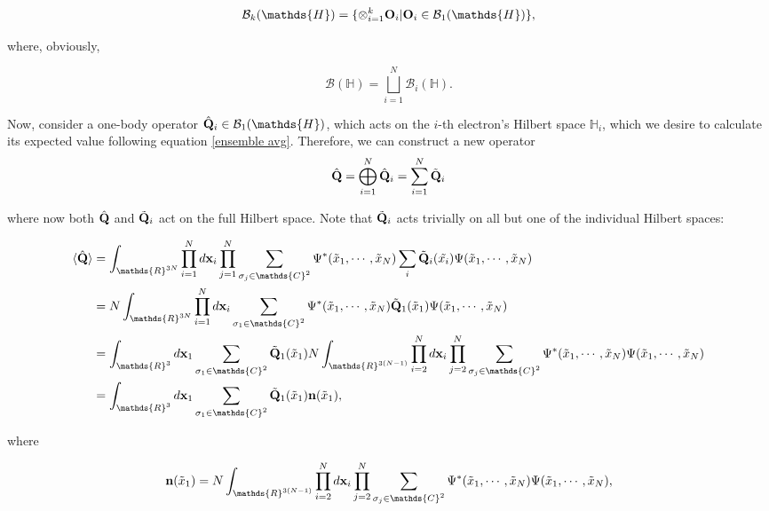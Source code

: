 \documentclass{homework}
\begin{document}
$$
\mathcal{B}_k(\mathds{H}) = \{\otimes_{i=1}^{k} {\bf O}_i | {\bf O}_i \in \mathcal{B}_1(\mathds{H}) \},
$$

where, obviously,

$$
\mathcal{B}(\mathds{H}) = \bigsqcup_{i=1}^{N} \mathcal{B}_i(\mathds{H}).
$$

Now, consider a one-body operator $\hat{\bf Q}_i \in \mathcal{B}_{1}(\mathds{H})$, which acts on the $i$-th electron's Hilbert space $\mathds{H}_i$, which we desire to calculate its expected value following equation \eqref{ensemble avg}. Therefore, we can construct a new operator 
$$
\hat{\bf Q} = \bigoplus_{i=1}^{N} \hat{\bf Q}_i = \sum_{i=1}^{N} \tilde{\bf Q}_i
$$

where now both $\hat{\bf Q}$ and $\tilde{\bf Q}_i$ act on the full Hilbert space. Note that $\tilde{\bf Q}_i$ acts trivially on all but one of the individual Hilbert spaces:

\begin{align}
     \langle \hat{\bf Q} \rangle &= \int_{\mathds{R}^{3N}} \prod_{i=1}^N d{\bf x}_i \prod_{j=1}^{N} \sum_{\sigma_j \in \mathds{C}^2} \Psi^{*}(\tilde{x}_1, \cdots, \tilde{x}_N)
     \sum_{i}
     \tilde{\bf Q}_i(\tilde{x_i})
     \Psi(\tilde{x}_1, \cdots, \tilde{x}_N) \\
     &= N \int_{\mathds{R}^{3N}} \prod_{i=1}^N d{\bf x}_i \sum_{\sigma_1 \in \mathds{C}^2} \Psi^{*}(\tilde{x}_1, \cdots, \tilde{x}_N)
     \tilde{\bf Q}_1(\tilde{x}_1)
     \Psi(\tilde{x}_1, \cdots, \tilde{x}_N) \\
     &= \int_{\mathds{R}^{3}} d{\bf x}_1 \sum_{\sigma_1 \in \mathds{C}^2} \tilde{\bf Q}_1(\tilde{x}_1) N \int_{\mathds{R}^{3(N-1)}} \prod_{i=2}^N d{\bf x}_i \prod_{j=2}^{N} \sum_{\sigma_j \in \mathds{C}^2} \Psi^{*}(\tilde{x}_1, \cdots, \tilde{x}_N)
     \Psi(\tilde{x}_1, \cdots, \tilde{x}_N) \\
     &= \int_{\mathds{R}^{3}} d{\bf x}_1 \sum_{\sigma_1 \in \mathds{C}^2} \tilde{\bf Q}_1(\tilde{x}_1) {\bf n}(\tilde{x}_1),
\label{one-body ensemble avg}
\end{align}

where 
 
\begin{equation}
{\bf n}(\tilde{x}_1) = N \int_{\mathds{R}^{3(N-1)}} \prod_{i=2}^N d{\bf x}_i \prod_{j=2}^{N} \sum_{\sigma_j \in \mathds{C}^2} \Psi^{*}(\tilde{x}_1, \cdots, \tilde{x}_N)
     \Psi(\tilde{x}_1, \cdots, \tilde{x}_N),
\label{one-body density}
\end{equation}
\end{document}
